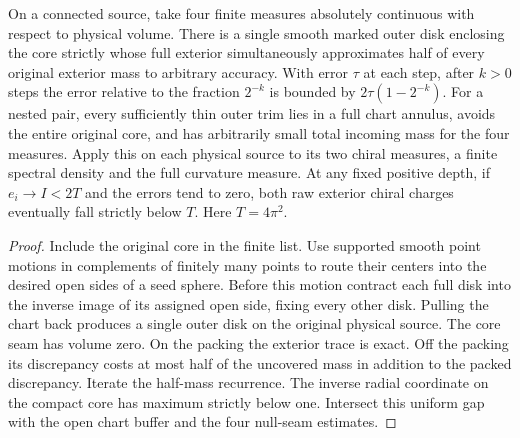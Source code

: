 \begin{proposition}
\label{prop:ed03-one-disk-separator}
\leanok
On a connected source, take four finite measures absolutely
continuous with respect to physical volume. There is a single smooth
marked outer disk enclosing the core strictly whose full exterior
simultaneously approximates half of every original exterior mass to
arbitrary accuracy. With error $\tau$ at each step, after $k>0$ steps the error
relative to the fraction $2^{-k}$ is bounded by $2\tau(1-2^{-k})$.
For a nested pair, every sufficiently thin outer trim lies in a full
chart annulus, avoids the entire original core, and has arbitrarily
small total incoming mass for the four measures. Apply this on each
physical source to its two chiral measures, a finite spectral density
and the full curvature measure. At any fixed positive depth, if
$e_i\to I<2T$ and the errors tend to zero, both raw exterior chiral
charges eventually fall strictly below $T$. Here $T=4\pi^2$.
\end{proposition}
\begin{proof}
\leanok
Include the original core in the finite list. Use supported smooth
point motions in complements of finitely many points to route their
centers into the desired open sides of a seed sphere. Before this
motion contract each full disk into the inverse image of its assigned
open side, fixing every other disk. Pulling the chart back produces a
single outer disk on the original physical source. The core seam has
volume zero. On the packing the exterior trace is exact. Off the packing its discrepancy costs at most half of the
uncovered mass in addition to the packed discrepancy. Iterate the
half-mass recurrence. The inverse radial coordinate on the compact
core has maximum strictly below one. Intersect this uniform gap with
the open chart buffer and the four null-seam estimates.
\end{proof}

